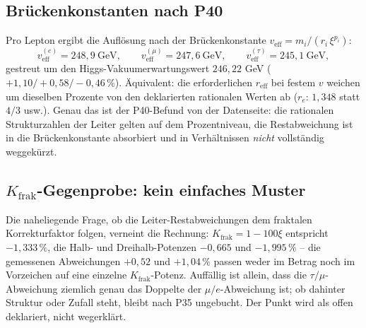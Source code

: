 \subsection{Brückenkonstanten nach P40}
Pro Lepton ergibt die Auflösung nach der Brückenkonstante
$v_{\text{eff}}=m_i/(r_i\,\xi^{p_i})$:
\begin{equation}
  v_{\text{eff}}^{(e)} = 248{,}9\ \text{GeV},\qquad
  v_{\text{eff}}^{(\mu)} = 247{,}6\ \text{GeV},\qquad
  v_{\text{eff}}^{(\tau)} = 245{,}1\ \text{GeV},
\end{equation}
gestreut um den Higgs-Vakuumerwartungswert $246{,}22$ GeV
($+1{,}10/+0{,}58/-0{,}46\,\%$). Äquivalent: die erforderlichen
$r_{\text{eff}}$ bei festem $v$ weichen um dieselben Prozente von den
deklarierten rationalen Werten ab ($r_e$: $1{,}348$ statt $4/3$ usw.). Genau
das ist der P40-Befund von der Datenseite: die rationalen Strukturzahlen der
Leiter gelten auf dem Prozentniveau, die Restabweichung ist in die
Brückenkonstante absorbiert und in Verhältnissen \emph{nicht} vollständig
weggekürzt.

\subsection{$K_{\text{frak}}$-Gegenprobe: kein einfaches Muster}
Die naheliegende Frage, ob die Leiter-Restabweichungen dem fraktalen
Korrekturfaktor folgen, verneint die Rechnung: $K_{\text{frak}}=1-100\xi$
entspricht $-1{,}333\,\%$, die Halb- und Dreihalb-Potenzen $-0{,}665$ und
$-1{,}995\,\%$ -- die gemessenen Abweichungen $+0{,}52$ und $+1{,}04\,\%$
passen weder im Betrag noch im Vorzeichen auf eine einzelne
$K_{\text{frak}}$-Potenz. Auffällig ist allein, dass die
$\tau/\mu$-Abweichung ziemlich genau das Doppelte der $\mu/e$-Abweichung ist;
ob dahinter Struktur oder Zufall steht, bleibt nach P35 ungebucht. Der Punkt
wird als offen deklariert, nicht wegerklärt.

